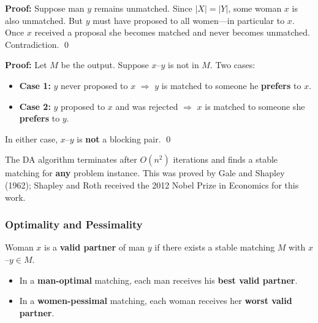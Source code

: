 \begin{thmbox}
\textbf{Proof:} Suppose man $y$ remains unmatched. Since $|X| = |Y|$, some woman $x$ is also unmatched. But $y$ must have proposed to all women---in particular to $x$. Once $x$ received a proposal she becomes matched and never becomes unmatched. Contradiction. \qed
\end{thmbox}

\begin{thmbox}
\textbf{Proof:} Let $M$ be the output. Suppose $x$--$y$ is not in $M$. Two cases:
\begin{itemize}
  \item \textbf{Case 1:} $y$ never proposed to $x$ $\Rightarrow$ $y$ is matched to someone he \textbf{prefers} to $x$.
  \item \textbf{Case 2:} $y$ proposed to $x$ and was rejected $\Rightarrow$ $x$ is matched to someone she \textbf{prefers} to $y$.
\end{itemize}
In either case, $x$--$y$ is \textbf{not} a blocking pair. \qed
\end{thmbox}

\begin{tipbox}
The DA algorithm terminates after $O(n^2)$ iterations and finds a stable matching for \textbf{any} problem instance. This was proved by Gale and Shapley (1962); Shapley and Roth received the 2012 Nobel Prize in Economics for this work.
\end{tipbox}

\separator

\subsubsection{Optimality and Pessimality}

\begin{defbox}
Woman $x$ is a \textbf{valid partner} of man $y$ if there exists a stable matching $M$ with $x$--$y \in M$.
\end{defbox}

\begin{defbox}
\begin{itemize}
  \item In a \textbf{man-optimal} matching, each man receives his \textbf{best valid partner}.
  \item In a \textbf{women-pessimal} matching, each woman receives her \textbf{worst valid partner}.
\end{itemize}
\end{defbox}

